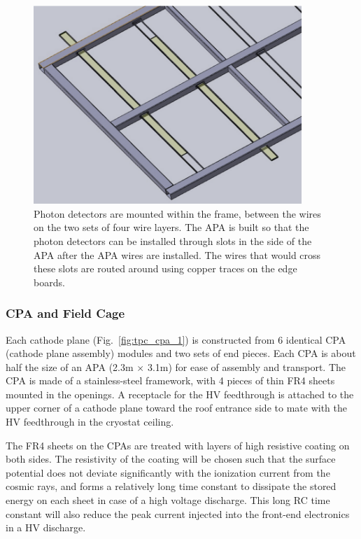 \begin{figure}[t]
  \centering
\includegraphics[width=4in]{figures/TPC_APA_3}
  \caption{Photon detectors are mounted within the frame, between the wires on the two sets of four wire layers.  The APA is built so that the photon detectors can be installed through slots in the side of the APA after the APA wires are installed.  The wires that would cross these slots are routed around using copper traces on the edge boards.}
\label{fig:pd_insertion}
\end{figure}


\subsubsection{CPA and Field Cage}



Each cathode plane (Fig.~\ref{fig:tpc_cpa_1}) is constructed from 6 identical CPA (cathode plane assembly) modules and two sets of end pieces. Each CPA is about half the size of an APA  (2.3m $\times$ 3.1m) for ease of assembly and transport.  The CPA is made of a stainless-steel framework, 
with 4 pieces of thin FR4 sheets mounted in the openings.  A receptacle for the HV feedthrough is attached to the upper corner of a cathode plane toward the roof entrance side to mate with the HV feedthrough in the cryostat ceiling. 

The FR4 sheets on the CPAs are treated with layers of high resistive coating on both sides.  The resistivity of the coating will be chosen such that the surface potential does not deviate significantly with the ionization current from the cosmic rays, and forms a relatively long time constant to dissipate the stored energy on each sheet in case of a high voltage discharge.  This long RC time constant will also reduce the peak current injected into the front-end electronics in a HV discharge.

